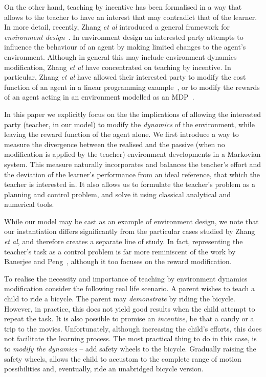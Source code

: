 \documentclass[letterpaper]{aamas2010}
\begin{document}
On the other hand, teaching by incentive has been formalised in a way
that allows to the teacher to have an interest that may contradict
that of the learner. In more detail, recently, Zhang \emph{et al}
introduced a general framework for \emph{environment
  design}~\cite{Zhang09:General}. In environment design an interested
party attempts to influence the behaviour of an agent by making limited
changes to the agent's environment. Although in general this may
include environment dynamics modification, Zhang \emph{et al} have
concentrated on teaching by incentive. In particular, Zhang \emph{et
  al} have allowed their interested party to modify the cost function
of an agent in a linear programming example~\cite{Zhang09:General}, or
to modify the rewards of an agent acting in an environment modelled as
an MDP~\cite{zhang_parkes_2008,Zhang09:Policy}.

In this paper we explicitly focus on the the implications of allowing
the interested party (teacher, in our model) to modify the
\emph{dynamics} of the environment, while leaving the reward function
of the agent alone. We first introduce a way to measure the divergence
between the realised and the passive (when no modification is applied
by the teacher) environment developments in a Markovian system. This
measure naturally incorporates and balances the teacher's effort and
the deviation of the learner's performance from an ideal reference,
that which the teacher is interested in. It also allows us to
formulate the teacher's problem as a planning and control problem, and
solve it using classical analytical and numerical tools.


While our model may be cast as an example of environment design, we
note that our instantiation differs significantly from the particular
cases studied by Zhang \emph{et al}, and therefore creates a separate
line of study. In fact, representing the teacher's task as a control
problem is far more reminiscent of the work by Banerjee and
Peng~\cite{banerjee_peng_2005}, although it too focuses on the reward
modification.

To realise the necessity and importance of teaching by
environment dynamics modification consider the following real life
scenario. A parent wishes to teach a child to ride a bicycle. The
parent may {\em demonstrate} by riding the bicycle. However, in
practice, this does not yield good results when the child attempt to
repeat the task. It is also possible to promise an {\em incentive}, be
that a candy or a trip to the movies. Unfortunately, although
increasing the child's efforts, this does not facilitate the learning
process. The most practical thing to do in this case, is to {\em
  modify the dynamics} -- add safety wheels to the bicycle. Gradually
raising the safety wheels, allows the child to accustom to the
complete range of motion possibilities and, eventually, ride an
unabridged bicycle version.
\end{document}
